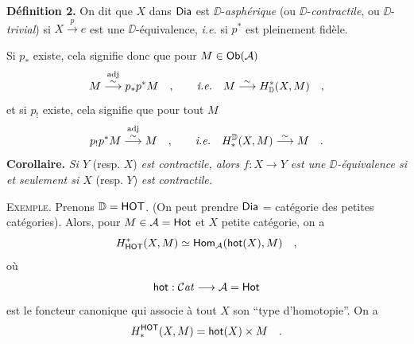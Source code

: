 \noindent\textbf{Définition 2.} On dit que $X$ dans $\mathsf{Dia}$ est $\DD$-\textit{asphérique} (ou $\DD$-\textit{contractile}, ou $\DD$-\textit{trivial}) si $X \overset{p}{\to} e$ est une $\DD$-équivalence, \textit{i.e.} si $p^*$ est pleinement fidèle.

Si $p_*$ existe, cela signifie donc que pour $M \in \mathsf{Ob}(\mathcal{A})$
\[
M \overset{\mathrm{adj}}{\overset{\sim}{\longrightarrow}} p_*p^*M \quad , \qquad \textit{i.e.} \quad M \overset{\sim}{\longrightarrow} H^*_{\mathbb{D}}(X, M) \quad ,
\]
et si $p_!$ existe, cela signifie que pour tout $M$
\[
p_!p^*M \overset{\mathrm{adj}}{\overset{\sim}{\longrightarrow}} M \quad , \qquad \textit{i.e.} \quad H^{\mathbb{D}}_*(X, M) \overset{\sim}{\longrightarrow} M \quad .
\]
\textbf{Corollaire.} \textit{Si $Y$} (resp. $X$) \textit{est contractile, alors $f : X \to Y$ est une $\DD$-équivalence si et seulement si $X$} (resp. $Y$) \textit{est contractile.}

\noindent\textsc{Exemple}. Prenons $\mathbb{D} = \mathsf{HOT}$. (On peut prendre $\mathsf{Dia}$ = catégorie des petites catégories). Alors, pour $M \in \mathcal{A} = \mathsf{Hot}$ et $X$ petite catégorie, on a
\[
H^*_{\mathsf{HOT}}(X, M) \simeq \mathsf{Hom}_{\mathcal{A}}(\mathsf{hot}(X), M) \quad ,
\]
où
\[
\mathsf{hot} : \mathcal{C}\mathit{at} \longrightarrow \mathcal{A} = \mathsf{Hot}
\]
est le foncteur canonique qui associe à tout $X$ son “type d'homotopie”. On a
\[
H^{\mathsf{HOT}}_*(X, M) = \mathsf{hot}(X) \times M \quad .
\]

\noindent{}

